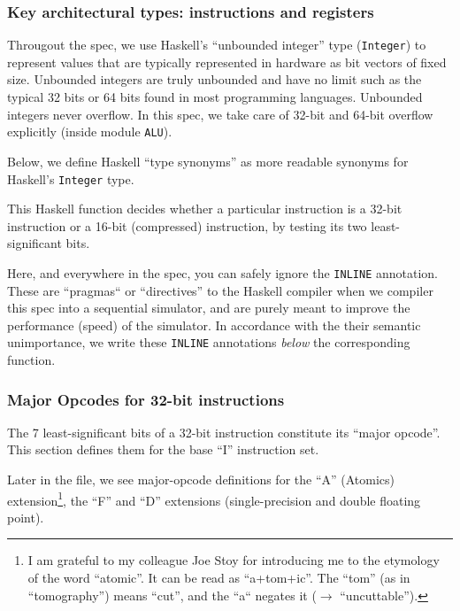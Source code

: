 \documentclass[11pt]{article}
\begin{document}



\subsubsection{Key architectural types: instructions and registers}

Througout the spec, we use Haskell's ``unbounded integer'' type
(\verb'Integer') to represent values that are typically represented in
hardware as bit vectors of fixed size.  Unbounded integers are truly
unbounded and have no limit such as the typical 32 bits or 64 bits
found in most programming languages.  Unbounded integers never
overflow. In this spec, we take care of 32-bit and 64-bit overflow
explicitly (inside module \verb|ALU|).

Below, we define Haskell ``type synonyms'' as more readable synonyms
for Haskell's {\tt Integer} type.



This Haskell function decides whether a particular instruction is a
32-bit instruction or a 16-bit (compressed) instruction, by testing
its two least-significant bits.



Here, and everywhere in the spec, you can safely ignore the
\verb|INLINE| annotation.  These are ``pragmas`` or ``directives'' to
the Haskell compiler when we compiler this spec into a sequential
simulator, and are purely meant to improve the performance (speed) of
the simulator.  In accordance with the their semantic unimportance, we
write these \verb|INLINE| annotations \emph{below} the corresponding
function.


\subsubsection{Major Opcodes for 32-bit instructions}

The 7 least-significant bits of a 32-bit instruction constitute its
``major opcode''.  This section defines them for the base ``I''
instruction set.



Later in the file, we see major-opcode definitions for the ``A''
(Atomics) extension\footnote{I am grateful to my colleague Joe Stoy
for introducing me to the etymology of the word ``atomic''.  It can be
read as ``a+tom+ic''.  The ``tom'' (as in ``tomography'') means
``cut'', and the ``a`` negates it ($\rightarrow$ ``uncuttable'').}, the ``F'' and
``D'' extensions (single-precision and double floating point).
\end{document}
